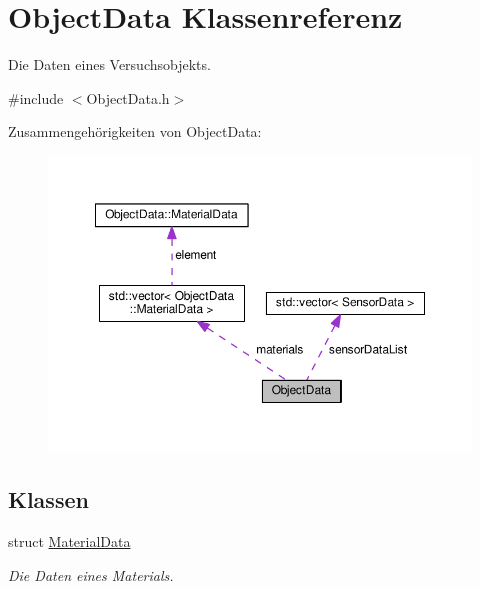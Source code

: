 \hypertarget{classObjectData}{\section{Object\-Data Klassenreferenz}
\label{classObjectData}
}


Die Daten eines Versuchsobjekts.  




{\ttfamily \#include $<$Object\-Data.\-h$>$}



Zusammengehörigkeiten von Object\-Data\-:\nopagebreak
\begin{figure}[H]
\begin{center}
\leavevmode
\includegraphics[width=350pt]{classObjectData__coll__graph}
\end{center}
\end{figure}
\subsection*{Klassen}
\begin{DoxyCompactItemize}
\item 
struct \hyperlink{structObjectData_1_1MaterialData}{Material\-Data}
\begin{DoxyCompactList}\small\item\em Die Daten eines Materials. \end{DoxyCompactList}\end{DoxyCompactItemize}
